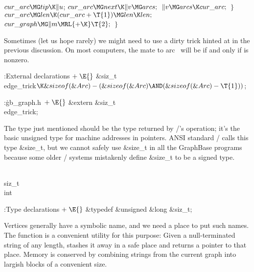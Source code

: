 ${}\\{cur\_arc}\MG\\{tip}\K\|u{}$;\5
${}\\{cur\_arc}\MG\\{next}\K\|v\MG\\{arcs};{}$\6
${}\|v\MG\\{arcs}\K\\{cur\_arc};{}$\6
\4${}\}{}$\2\6
${}\\{cur\_arc}\MG\\{len}\K(\\{cur\_arc}+\T{1})\MG\\{len}\K\\{len};{}$\6
${}\\{cur\_graph}\MG\|m\MRL{+{\K}}\T{2};{}$\6
\4${}\}{}$\2\par
\fi

Sometimes (let us hope rarely) we might need to use a dirty trick
hinted at in the previous discussion. On most computers, the mate to
arc~ will be  if and only if 
is nonzero.

\Y\B\4:External declarations\X${}\mathrel+\E{}$\6
\&{siz\_t} \\{edge\_trick}${}\K\&{sizeof}(\&{Arc})-(\&{sizeof}(\&{Arc})\AND(%
\&{sizeof}(\&{Arc})-\T{1})){}$;\par
\fi

\B{}:\.{gb\_graph.h\,}\X${}\mathrel+\E{}$\6
\&{extern} \&{siz\_t} \\{edge\_trick};\par
\fi

The type  just mentioned should be the type returned by %
\CEE/'s
 operation; it's the basic unsigned type for machine
addresses in pointers. ANSI standard \CEE/ calls this type \&{size\_t},
but we cannot safely use \&{size\_t} in all the GraphBase programs
because some older \CEE/
systems mistakenly define \&{size\_t} to be a signed type.

\Y\B\F\\{siz\_t}\5
\\{int}\par
\Y\B\4:Type declarations\X${}\mathrel+\E{}$\6
\&{typedef} \&{unsigned} \&{long} \&{siz\_t};\par
\fi

Vertices generally have a symbolic name, and we need a place to put
such names. The  function is a convenient utility
for this purpose:
Given a null-terminated string of any length,  stashes
it away in a safe place and returns a pointer to that place. Memory is
conserved by combining strings from the current graph into largish blocks
of a convenient size.

